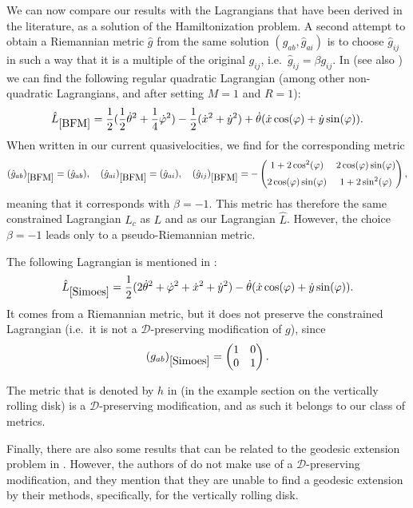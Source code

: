 \documentclass[11pt]{article}
\def\D{{\mathcal D}}
\begin{document}
We can now compare our results with the Lagrangians that have been derived in the literature, as a solution of the Hamiltonization problem. A second attempt to obtain a Riemannian metric $\hat g$ from the same solution $(g_{ab},{\hat g}_{ai})$ is to choose ${\hat g}_{ij}$ in such a way that it is a multiple of the original $g_{ij}$, i.e.\ ${\hat g}_{ij} = \beta g_{ij}$. 
In \cite{BFM} (see also \cite{FB}) we can find the following regular quadratic Lagrangian (among other non-quadratic Lagrangians,   and after setting $M=1$ and $R=1$):
\[
{\hat L}_{\cite{BFM}} = \frac{1}{2} ( \frac{1}{2} {\dot\theta}^2 +  \frac{1}{4}  {\dot\varphi}^2) - \frac{1}{2}( {\dot x}^2 + {\dot y}^2) + \dot\theta (\dot x \cos(\varphi) + \dot y \sin(\varphi)).
\]
When written in our current quasivelocities, we find for the corresponding metric 
\[
({\hat g}_{ab})_{\cite{BFM}} = ({\hat g}_{ab}),\quad ({\hat g}_{ai})_{\cite{BFM}} = ({\hat g}_{ai}),\quad ({\hat g}_{ij})_{\cite{BFM}} = - \begin{pmatrix} 1+ {2} \cos^2(\varphi) &   {2} \cos(\varphi)\sin(\varphi) \\[2mm]  {2} \cos(\varphi)\sin(\varphi) & 1+ {2} \sin^2(\varphi)  \end{pmatrix},
\]
meaning that it corresponds with $\beta=-1$. This metric has therefore the same constrained Lagrangian $L_c$ as $L$ and as our Lagrangian $\hat L$. However, the choice $\beta=-1$ leads only to a pseudo-Riemannian metric.


The following Lagrangian is mentioned in \cite{Simoes}:
\[
{\hat L}_{\cite{Simoes}} = \frac{1}{2} (2{\dot\theta}^2 + {\dot\varphi}^2+ {\dot x}^2 + {\dot y}^2 ) - \dot\theta (\dot x \cos(\varphi) + \dot y \sin(\varphi)). 
\]
It  comes from a Riemannian metric, but it does not preserve the constrained Lagrangian (i.e.\ it is not a $\D$-preserving modification of $g$), since 
\[
(g_{ab})_{\cite{Simoes}} =  \begin{pmatrix} 1 & 0 \\ 0 & 1 \end{pmatrix}.
\]

 The metric that is denoted by $h$ in \cite{recent} (in the example section on the vertically rolling disk) is a $\D$-preserving modification, and as such it belongs to our class of metrics.

 Finally, there are also some results that can be related to the geodesic extension problem in \cite{BC}. However, the authors of \cite{BC} do not make use of a $\D$-preserving modification, and they mention that they are unable to find a geodesic extension by their methods, specifically, for the vertically rolling disk. 
\end{document}

